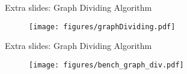 \documentclass[10pt]{beamer}
\begin{document}

\begin{frame}[fragile]{Extra slides: Graph Dividing Algorithm}
    \begin{figure}[h!]
        \centering
            \texttt{[image: figures/graphDividing.pdf]}
    \end{figure}
\end{frame}

\begin{frame}[fragile]{Extra slides: Graph Dividing Algorithm}
    \begin{figure}[h!]
        \centering
            \texttt{[image: figures/bench\_graph\_div.pdf]}
    \end{figure}
\end{frame}
\end{document}
